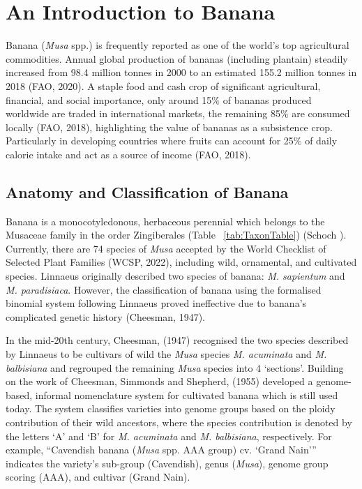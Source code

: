 \section {An Introduction to Banana}

Banana (\textit{Musa} spp.) is frequently reported as one of the world’s top agricultural commodities. Annual global production of bananas (including plantain) steadily increased from 98.4 million tonnes in 2000 to an estimated 155.2 million tonnes in 2018 (FAO, 2020). A staple food and cash crop of significant agricultural, financial, and social importance, only around 15\% of bananas produced worldwide are traded in international markets, the remaining 85\% are consumed locally (FAO, 2018), highlighting the value of bananas as a subsistence crop. Particularly in developing countries where fruits can account for 25\% of daily calorie intake and act as a source of income (FAO, 2018).

\subsection{Anatomy and Classification of Banana}  

Banana is a monocotyledonous, herbaceous perennial which belongs to the Musaceae family in the order Zingiberales (Table ~\ref{tab:TaxonTable}) (Schoch ). Currently, there are 74 species of \textit{Musa} accepted by the World Checklist of Selected Plant Families (WCSP, 2022), including wild, ornamental, and cultivated species. Linnaeus originally described two species of banana: \textit{M. sapientum }and \textit{M. paradisiaca}. However, the classification of banana using the formalised binomial system following Linnaeus proved ineffective due to banana’s complicated genetic history (Cheesman, 1947).  



In the mid-20th century, Cheesman, (1947) recognised the two species described by Linnaeus to be cultivars of wild the \textit{Musa} species \textit{M. acuminata }and \textit{M. balbisiana} and regrouped the remaining \textit{Musa} species into 4 ‘sections’. Building on the work of Cheesman, Simmonds and Shepherd, (1955) developed a genome-based, informal nomenclature system for cultivated banana which is still used today. The system classifies varieties into genome groups based on the ploidy contribution of their wild ancestors, where the species contribution is denoted by the letters ‘A’ and ‘B’ for \textit{M. acuminata} and \textit{M. balbisiana}, respectively. For example, “Cavendish banana (\textit{Musa }spp. AAA group) cv. ‘Grand Nain’” indicates the variety’s sub-group (Cavendish), genus (\textit{Musa}), genome group scoring (AAA), and cultivar (Grand Nain).

